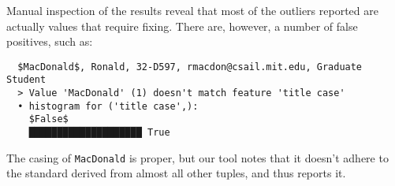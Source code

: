 Manual inspection of the results reveal that most of the outliers reported are actually values that require fixing. There are, however, a number of false positives, such as:

\begin{lstlisting}
  $MacDonald$, Ronald, 32-D597, rmacdon@csail.mit.edu, Graduate Student    
  > Value 'MacDonald' (1) doesn't match feature 'title case'  
  • histogram for ('title case',):
    $False$
    ████████████████████ True
\end{lstlisting}

The casing of \lstinline{MacDonald} is proper, but our tool notes that it doesn't adhere to the standard derived from almost all other tuples, and thus reports it. 
